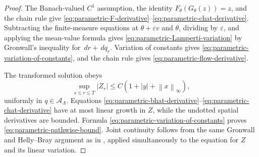 \documentclass[11pt,reqno]{amsart}
\theoremstyle{plain}
\theoremstyle{definition}
\newcommand{\cA}{\mathcal A}
\newcommand{\eps}{\varepsilon}
\newcommand{\dd}{\,d}
\newcommand{\norm}[1]{\left\lVert #1\right\rVert}
\newcommand{\abs}[1]{\left\lvert #1\right\rvert}
\begin{document}
\begin{proof}
The Banach-valued \(C^1\) assumption, the identity
\(F_\theta(G_\theta(z))=z\), and the chain rule give
\eqref{eq:parametric-F-derivative}--\eqref{eq:parametric-chat-derivative}.
Subtracting the finite-measure equations at \(\theta+\eps v\) and \(\theta\),
dividing by \(\eps\), and applying the mean-value formula gives
\eqref{eq:parametric-Lamperti-variation} by Gronwall's inequality for
\(\dd r+\dd q_r\).  Variation of constants gives
\eqref{eq:parametric-variation-of-constants}, and the chain rule gives
\eqref{eq:parametric-flow-derivative}.

The transformed solution obeys
\[
  \sup_{s\le r\le T}\abs{Z_r}
  \le C(1+\abs{y}+\norm{x}_\infty),
\]
uniformly in \(q\in\cA_\Lambda\).  Equations
\eqref{eq:parametric-bhat-derivative}--\eqref{eq:parametric-chat-derivative}
have at most linear growth in \(Z\), while the undotted spatial derivatives
are bounded.  Formula \eqref{eq:parametric-variation-of-constants} proves
\eqref{eq:parametric-pathwise-bound}.  Joint continuity follows from the
same Gronwall and Helly--Bray argument as in
, applied simultaneously to the equation for
\(Z\) and its linear variation.
\end{proof}
\end{document}
